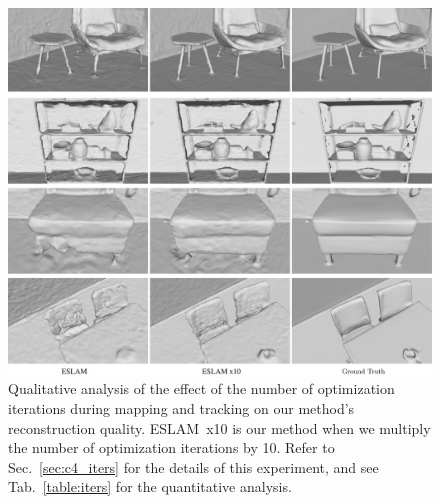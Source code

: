 \begin{figure}[t]
    \begin{center}
        \includegraphics[width=1.0\linewidth]{images/chapter4/figures/iters.jpg}
    \end{center}
    \caption{Qualitative analysis of the effect of the number of optimization iterations during mapping and tracking on our method's reconstruction quality. ESLAM~x10 is our method when we multiply the number of optimization iterations by 10. Refer to Sec.~\ref{sec:c4_iters} for the details of this experiment, and see Tab.~\ref{table:iters} for the quantitative analysis.}
    \label{fig:c4_iters}
\end{figure}

